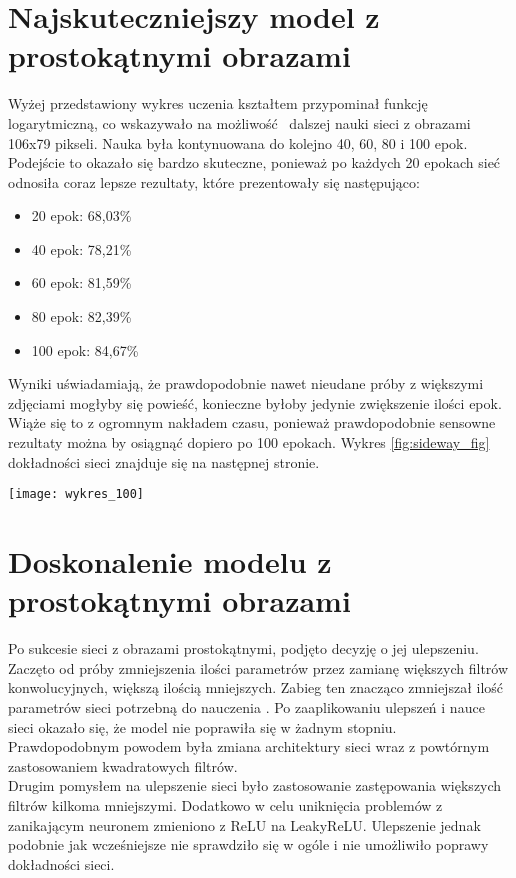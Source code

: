 \section{Najskuteczniejszy model z prostokątnymi obrazami}
Wyżej przedstawiony wykres uczenia kształtem przypominał funkcję logarytmiczną, co wskazywało na możliwość 
dalszej nauki sieci z obrazami 106x79 pikseli. Nauka była kontynuowana do kolejno 40, 60, 80 i 100 epok.\\
Podejście to okazało się bardzo skuteczne, ponieważ po każdych 20 epokach
sieć odnosiła coraz lepsze rezultaty, które prezentowały się następująco:\\
\begin{itemize}
\item  20 epok: 68,03\%\\
\item  40 epok: 78,21\%\\
\item  60 epok: 81,59\%\\
\item  80 epok: 82,39\%\\
\item  100 epok: 84,67\%\\
\end{itemize}
Wyniki uświadamiają, że prawdopodobnie nawet nieudane próby z większymi zdjęciami
mogłyby się powieść, konieczne byłoby jedynie zwiększenie ilości epok. Wiąże się to
z ogromnym nakładem czasu, ponieważ prawdopodobnie sensowne rezultaty można by osiągnąć
dopiero po 100 epokach. Wykres \ref{fig:sideway_fig} dokładności sieci znajduje się na następnej stronie.

\begin{sidewaysfigure}
\texttt{[image: wykres\_100]}
\caption{Wykres uczenia przez 100 epok}
\label{fig:sideway_fig}
\end{sidewaysfigure}

\section{Doskonalenie modelu z prostokątnymi obrazami}
Po sukcesie sieci z obrazami prostokątnymi, podjęto decyzję o jej ulepszeniu.
Zaczęto od próby zmniejszenia ilości parametrów przez zamianę większych filtrów konwolucyjnych,
większą ilością mniejszych. Zabieg ten znacząco zmniejszał ilość parametrów sieci potrzebną do nauczenia \cite{substBigConv}.
Po zaaplikowaniu ulepszeń i nauce sieci okazało się, że model nie poprawiła się w żadnym
stopniu. Prawdopodobnym powodem była zmiana architektury sieci wraz z powtórnym
zastosowaniem kwadratowych filtrów.\\
Drugim pomysłem na ulepszenie sieci było zastosowanie zastępowania większych filtrów
kilkoma mniejszymi. Dodatkowo w celu uniknięcia problemów z zanikającym neuronem zmieniono z ReLU na LeakyReLU.
Ulepszenie jednak podobnie jak wcześniejsze nie sprawdziło się w ogóle i nie umożliwiło poprawy dokładności sieci.
